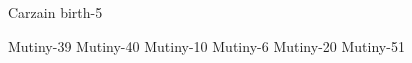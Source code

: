 \begin{comment}
\section{Geicans}
\end{comment}

\newcommand{\Belzhir}          {Bel\v zir\xspace} 
\newcommand{\Belzir}           {\Belzhir}
\newcommand{\Cormin}           {Cormin\xspace}%
\newcommand{\Freid}            {Freid\xspace} %
\newcommand{\Kazzed}           {Kazzed\xspace} %

 {Carzain birth}{-5}









\begin{comment}
\section{Imetrians}
\end{comment}

\newcommand{\IlcasStartRank}   {\Salican}
\newcommand{\IlcSR}            {\IlcasStartRank}

 {Mutiny}{-39}
   {Mutiny}{-40}
        {Mutiny}{-10}
           {Mutiny}{-6}
     {Mutiny}{-20}
   {Mutiny}{-51}









\begin{comment}
\section{\Imrathi}
\end{comment}

\begin{comment}
\subsubsection{Humans}
\end{comment}


